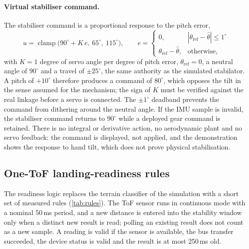 \documentclass[11pt,a4paper]{article}
\begin{document}
\paragraph{Virtual stabiliser command.} The stabiliser command is a proportional response to the pitch error,
\begin{equation}
u=\operatorname{clamp}\bigl(90^\circ+K\,e,\ 65^\circ,\ 115^\circ\bigr),\qquad e=\begin{cases}0,&|\theta_{\mathrm{ref}}-\hat\theta|\le1^\circ\\[2pt]\theta_{\mathrm{ref}}-\hat\theta,&\text{otherwise,}\end{cases}
\label{eq:vstab}
\end{equation}
with $K=1$ degree of servo angle per degree of pitch error, $\theta_{\mathrm{ref}}=0$, a neutral angle of $90^\circ$ and a travel of $\pm25^\circ$, the same authority as the simulated stabilator. A pitch of $+10^\circ$ therefore produces a command of $80^\circ$, which opposes the tilt in the sense assumed for the mechanism; the sign of $K$ must be verified against the real linkage before a servo is connected. The $\pm1^\circ$ deadband prevents the command from dithering around the neutral angle. If the IMU sample is invalid, the stabiliser command returns to $90^\circ$ while a deployed gear command is retained. There is no integral or derivative action, no aerodynamic plant and no servo feedback: the command is displayed, not applied, and the demonstration shows the response to hand tilt, which does not prove physical stabilisation.
 
\subsection{One-ToF landing-readiness rules}\label{sec:readiness}
The readiness logic replaces the terrain classifier of the simulation with a short set of measured rules (\cref{tab:rules}). The ToF sensor runs in continuous mode with a nominal 50\,ms period, and a new distance is entered into the stability window only when a distinct new result is read; polling an existing result does not count as a new sample. A reading is valid if the sensor is available, the bus transfer succeeded, the device status is valid and the result is at most 250\,ms old.
 
\end{document}
